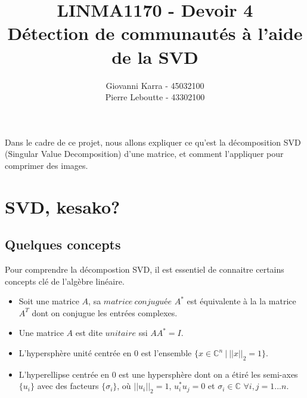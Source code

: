 \documentclass[11pt]{article}
\title{LINMA1170 - Devoir 4\\Détection de communautés à l'aide de la SVD}
\author{Giovanni Karra - 45032100\\Pierre Leboutte - 43302100}
\begin{document}
\maketitle

Dans le cadre de ce projet, nous allons expliquer ce qu'est la décomposition SVD (Singular Value Decomposition) d'une matrice, et comment l'appliquer pour comprimer des images.

\section*{SVD, kesako?}

\subsection*{Quelques concepts}
Pour comprendre la décompostion SVD, il est essentiel de connaitre certains concepts clé de l'algèbre linéaire.\\
\begin{itemize}
	\item Soit une matrice $A$, sa $matrice ~conjugu$é$e$ $A^*$ est équivalente à la la matrice $A^T$ dont on conjugue les entrées complexes. 
	\item Une matrice $A$ est dite $unitaire$ ssi $AA^* = I$.
	\item L'hypersphère unité centrée en 0 est l'ensemble $\{x \in \mathbb{C}^n ~|~ ||x||_2 = 1\}$.
	\item L'hyperellipse centrée en 0 est une hypersphère dont on a étiré les semi-axes $\{u_i\}$ avec des facteurs $\{\sigma_i\}$, où $||u_i||_2 = 1$, $u_i^*u_j = 0$ et $\sigma_i \in \mathbb{C}$ \space\space $\forall i, j = {1...n}$.
\end{itemize}
\end{document}
